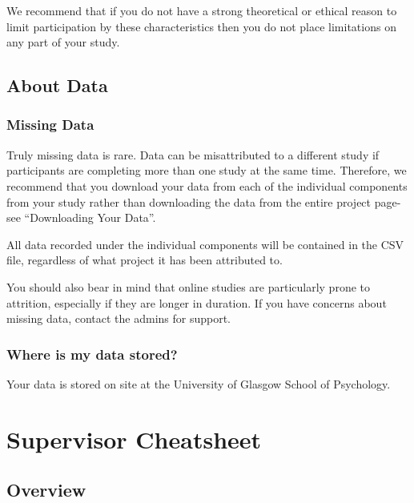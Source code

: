 \documentclass[]{book}
\begin{document}
We recommend that if you do not have a strong theoretical or ethical reason to limit participation by these characteristics then you do not place limitations on any part of your study.

\hypertarget{about-data}{%
\section*{About Data}\label{about-data}}

\hypertarget{missing-data}{%
\subsection*{Missing Data}\label{missing-data}}

Truly missing data is rare. Data can be misattributed to a different study if participants are completing more than one study at the same time. Therefore, we recommend that you download your data from each of the individual components from your study rather than downloading the data from the entire project page- see ``Downloading Your Data''.

All data recorded under the individual components will be contained in the CSV file, regardless of what project it has been attributed to.

You should also bear in mind that online studies are particularly prone to attrition, especially if they are longer in duration. If you have concerns about missing data, contact the admins for support.

\hypertarget{where-is-my-data-stored}{%
\subsection*{Where is my data stored?}\label{where-is-my-data-stored}}

Your data is stored on site at the University of Glasgow School of Psychology.

\hypertarget{supervisor-cheatsheet}{%
\chapter*{Supervisor Cheatsheet}\label{supervisor-cheatsheet}}

\hypertarget{overview-9}{%
\section*{Overview}\label{overview-9}}
\end{document}
